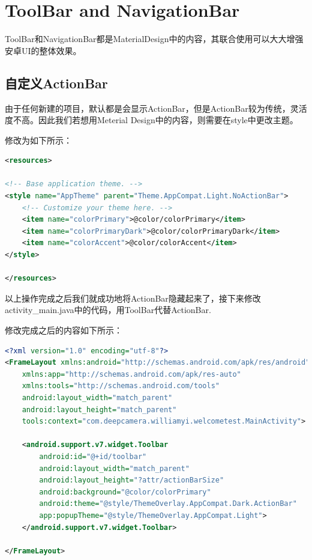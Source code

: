 \documentclass[UTF8, Microsoft YaHei]{book}
\begin{document}
    \section{ToolBar and NavigationBar}
    ToolBar和NavigationBar都是MaterialDesign中的内容，其联合使用可以大大增强安卓UI的整体效果。

    \subsection{自定义ActionBar}
    由于任何新建的项目，默认都是会显示ActionBar，但是ActionBar较为传统，灵活度不高。因此我们若想用Meterial Design中的内容，则需要在style中更改主题。

    修改为如下所示：

\begin{small}
\begin{lstlisting}[language=xml]
<resources>

<!-- Base application theme. -->
<style name="AppTheme" parent="Theme.AppCompat.Light.NoActionBar">
    <!-- Customize your theme here. -->
    <item name="colorPrimary">@color/colorPrimary</item>
    <item name="colorPrimaryDark">@color/colorPrimaryDark</item>
    <item name="colorAccent">@color/colorAccent</item>
</style>

</resources>
\end{lstlisting}
\end{small}

	以上操作完成之后我们就成功地将ActionBar隐藏起来了，接下来修改activity\_main.java中的代码，用ToolBar代替ActionBar.

	修改完成之后的内容如下所示：

\begin{small}
\begin{lstlisting}[language=xml]
<?xml version="1.0" encoding="utf-8"?>
<FrameLayout xmlns:android="http://schemas.android.com/apk/res/android"
    xmlns:app="http://schemas.android.com/apk/res-auto"
    xmlns:tools="http://schemas.android.com/tools"
    android:layout_width="match_parent"
    android:layout_height="match_parent"
    tools:context="com.deepcamera.williamyi.welcometest.MainActivity">

    <android.support.v7.widget.Toolbar
        android:id="@+id/toolbar"
        android:layout_width="match_parent"
        android:layout_height="?attr/actionBarSize"
        android:background="@color/colorPrimary"
        android:theme="@style/ThemeOverlay.AppCompat.Dark.ActionBar"
        app:popupTheme="@style/ThemeOverlay.AppCompat.Light">
    </android.support.v7.widget.Toolbar>

</FrameLayout>
\end{lstlisting}
\end{small}
\end{document}
